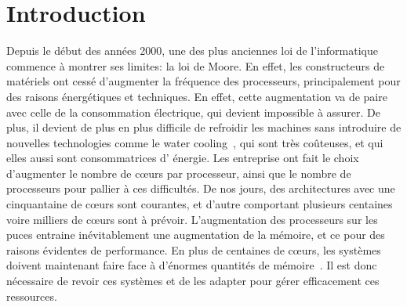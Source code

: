 \section{Introduction}

  \hspace{1cm}Depuis le début des années 2000, une des plus anciennes loi de
  l'informatique commence à montrer ses limites: la loi de Moore. En effet, les
  constructeurs de matériels ont cessé d'augmenter la fréquence des processeurs,
  principalement pour des raisons énergétiques et
  techniques. En effet, cette augmentation va de paire
  avec celle de la consommation électrique, qui devient impossible à assurer. De
  plus, il devient de plus en plus difficile de refroidir les machines sans
  introduire de nouvelles technologies comme le water
  cooling~\citep{googleXXXXdatacenters}, qui sont très coûteuses, et qui elles
  aussi sont consommatrices d' énergie. Les entreprise ont fait le choix
  d'augmenter le nombre de c\oe urs par processeur, ainsi que le nombre de
  processeurs pour pallier à ces difficultés. De nos jours, des architectures
  avec une cinquantaine de c\oe urs sont courantes, et d'autre comportant
  plusieurs centaines voire milliers de c\oe urs sont à prévoir. L'augmentation
  des processeurs sur les puces entraine inévitablement une augmentation de la
  mémoire, et ce pour des raisons évidentes de performance. En plus de centaines
  de c\oe urs, les systèmes doivent maintenant faire face à d'énormes quantités
  de mémoire~\citep{hp2012z820, puget2013z9pe}. Il est donc nécessaire de revoir
  ces systèmes et de les adapter pour gérer efficacement ces ressources.\newline
  

